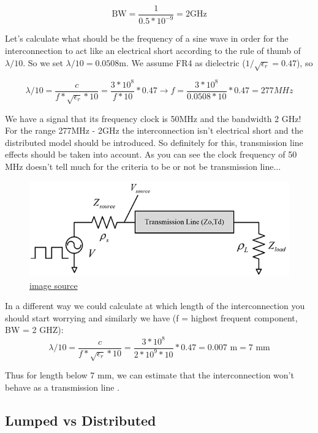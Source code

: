 \documentclass[final]{cubedoc}
\begin{document}
	\[\text{BW} = \frac{1}{0.5 * 10^{-9}} = 2 \text{GHz}\]
	
	Let's calculate what should be the frequency of a sine wave in order for the interconnection to act like an electrical short according to the rule of thumb of $\lambda/10$. So we set $\lambda/10 = 0.0508 \text{m}$. We assume FR4 as dielectric ($1/\sqrt{\epsilon_r} = 0.47$), so
	
	\[\lambda/10 = \frac{c}{f * \sqrt{\epsilon_r} * 10} = \frac{3 * 10^8}{f * 10} * 0.47 \rightarrow f = \frac{3 * 10^8}{0.0508 * 10} * 0.47 = 277 MHz \]
	
	We have a signal that its frequency clock is 50MHz and the bandwidth 2 GHz! For the range 277MHz - 2GHz the interconnection isn't electrical short and the distributed model should be introduced. So definitely for this, transmission line effects should be taken into account. As you can see the clock frequency of 50 MHz doesn't tell much for the criteria to be or not be transmission line... 
	
	\begin{figure}[h!]
		\centering
		\includegraphics[keepaspectratio, width = .8\textwidth]{assets/transmission_input.png}
		\caption{\href{https://web.archive.org/web/20200814093205/https://incompliancemag.com/article/an-overview-of-transmission-lines-in-electronic-systems/}{image source}}
	\end{figure}
	
	In a different way we could calculate at which length of the interconnection you should start worrying and similarly we have (f = highest frequent component, BW = 2 GHZ):
	\[\lambda/10 = \frac{c}{f * \sqrt{\epsilon_r} * 10} = \frac{3 * 10^8}{2*10^9 * 10} * 0.47 = 0.007 \text{ m} = 7 \text{ mm} \]
	
	Thus for length below 7 mm, we can estimate that the interconnection won't behave as a transmission line \cite{paul2011transmission}.
	
	\subsection{Lumped vs Distributed}
	
\end{document}
